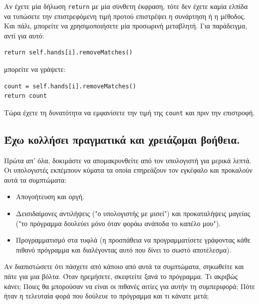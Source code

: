 \documentclass[10pt]{book}
\begin{document}
Αν έχετε μία δήλωση {\tt return} με μία σύνθετη έκφραση, τότε δεν έχετε καμία ελπίδα να τυπώσετε την
επιστρεφόμενη τιμή προτού επιστρέψει η συνάρτηση ή η μέθοδος.  Και πάλι, μπορείτε να χρησιμοποιήσετε
μία προσωρινή μεταβλητή.  Για παράδειγμα, αντί για αυτό:

\begin{verbatim}
return self.hands[i].removeMatches()
\end{verbatim}
%
μπορείτε να γράψετε:

\begin{verbatim}
count = self.hands[i].removeMatches()
return count
\end{verbatim}
%
Τώρα έχετε τη δυνατότητα να εμφανίσετε την τιμή της {\tt count} και πριν την επιστροφή.


\subsection{Έχω κολλήσει πραγματικά και χρειάζομαι βοήθεια.}

Πρώτα απ' όλα, δοκιμάστε να απομακρυνθείτε από τον υπολογιστή για μερικά λεπτά.  
Οι υπολογιστές εκπέμπουν κύματα τα οποία επηρεάζουν τον εγκέφαλο και προκαλούν 
αυτά τα συμπτώματα:

\begin{itemize}

 
\item Απογοήτευση και οργή.

\item Δεισιδαίμονες αντιλήψεις ("ο υπολογιστής με μισεί") και προκαταλήψεις μαγείας ("το πρόγραμμα
δουλεύει μόνο όταν φοράω ανάποδα το καπέλο μου"). 

\item Προγραμματισμό στα τυφλά (η προσπάθεια να προγραμματίσετε γράφοντας κάθε πιθανό πρόγραμμα
και διαλέγοντας αυτό που δίνει το σωστό αποτέλεσμα).
 

\end{itemize}

Αν διαπιστώσετε ότι πάσχετε από κάποιο από αυτά τα συμπτώματα, σηκωθείτε και πάτε για μια βόλτα.
Όταν ηρεμήσετε, σκεφτείτε ξανά το πρόγραμμα. Τι ακριβώς κάνει;  Ποιες θα μπορούσαν να είναι οι
πιθανές αιτίες για αυτήν τη συμπεριφορά;  Πότε ήταν η τελευταία φορά που δούλευε το πρόγραμμα και
τι κάνατε μετά;
\end{document}

